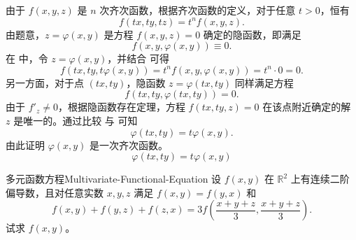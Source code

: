 \begin{myproof}
    由于 $f(x, y, z)$ 是 $n$ 次齐次函数，根据齐次函数的定义，对于任意 $t > 0$，恒有
    \begin{equation}
        f(tx, ty, tz) = t^n f(x, y, z). \label{eq:homo-def}
    \end{equation}
    由题意，$z = \varphi(x, y)$ 是方程 $f(x, y, z) = 0$ 确定的隐函数，即满足
    \begin{equation}
        f(x, y, \varphi(x, y)) \equiv 0. \label{eq:implicit-relation}
    \end{equation}
    在  中，令 $z = \varphi(x, y)$，并结合  可得
    \begin{equation}
        f(tx, ty, t\varphi(x, y)) = t^n f(x, y, \varphi(x, y)) = t^n \cdot 0 = 0. \label{eq:scaled-zero}
    \end{equation}
    另一方面，对于点 $(tx, ty)$，隐函数 $z = \varphi(tx, ty)$ 同样满足方程
    \begin{equation}
        f(tx, ty, \varphi(tx, ty)) = 0. \label{eq:scaled-implicit}
    \end{equation}
    由于 $f'_z \neq 0$，根据隐函数存在定理，方程 $f(tx, ty, z) = 0$ 在该点附近确定的解 $z$ 是唯一的。通过比较  与  可知
    \begin{equation}
        \varphi(tx, ty) = t\varphi(x, y).
    \end{equation}
    由此证明 $\varphi(x, y)$ 是一次齐次函数。
    \begin{equation}
        \boxed{\varphi(tx, ty) = t\varphi(x, y)}
    \end{equation}
\end{myproof}



\begin{problem}{多元函数方程}{Multivariate-Functional-Equation}
    设 $f(x,y)$ 在 $\mathbb{R}^2$ 上有连续二阶偏导数，且对任意实数 $x,y,z$ 满足 $f(x,y)=f(y,x)$ 和
    \begin{equation}
        f(x,y) + f(y,z) + f(z,x) = 3f\left(\frac{x+y+z}{3}, \frac{x+y+z}{3}\right).
    \end{equation}
    试求 $f(x,y)$。
\end{problem}

